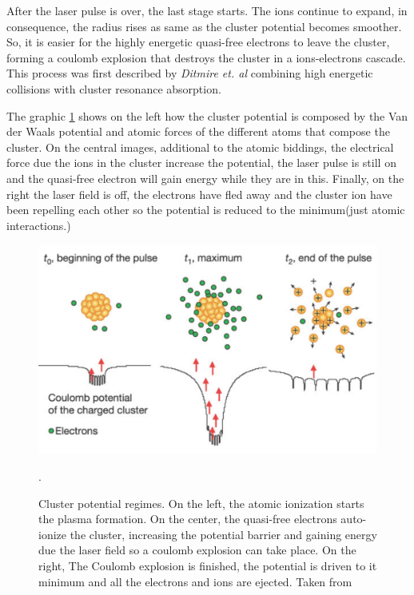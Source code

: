 After the laser pulse is over, the last stage starts. The ions continue to expand, in consequence, the radius rises as same as the cluster potential becomes smoother. So, it is easier for the highly energetic quasi-free electrons to leave the cluster, forming a coulomb explosion that destroys the cluster in a ions-electrons cascade. This process was first described by \textit{Ditmire et. al} \cite{ditmire_interaction_1996} combining high energetic collisions with cluster resonance absorption.

The graphic \ref{img:clusterpotential} shows on the left how the cluster potential is composed by the Van der Waals potential and atomic forces of the different atoms that compose the cluster. On the central images, additional to the atomic biddings, the electrical force due the ions in the cluster increase the potential, the laser pulse is still on and the quasi-free electron will gain energy while they are in this. Finally, on the right the laser field is off, the electrons have fled away and the cluster ion have been repelling each other so the potential is reduced to the minimum(just atomic interactions.)

\begin{figure}[h!] \label{img:clusterpotential}

\centering
\includegraphics[scale=0.35]{../Images/clusterpotential.PNG}
\caption[Cluster potential regimes]{Cluster potential regimes. On the left, the atomic ionization starts the plasma formation. On the center, the quasi-free electrons auto-ionize the cluster, increasing the potential barrier and gaining energy due the laser field so a coulomb explosion can take place. On the right, The Coulomb explosion is finished, the potential is driven to it minimum and all the electrons and ions are ejected. Taken from \cite{wabnitz_multiple_2002}}.
\label{img:clusterpotential}
\end{figure}

